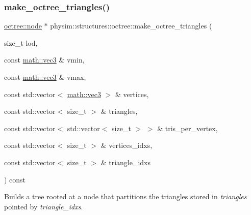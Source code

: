 \subsubsection{\texorpdfstring{make\+\_\+octree\+\_\+triangles()}{make\_octree\_triangles()}}
{\footnotesize\ttfamily \hyperlink{structphysim_1_1structures_1_1octree_1_1node}{octree\+::node} $\ast$ physim\+::structures\+::octree\+::make\+\_\+octree\+\_\+triangles (\begin{DoxyParamCaption}\item[{size\+\_\+t}]{lod,  }\item[{const \hyperlink{structphysim_1_1math_1_1vec3}{math\+::vec3} \&}]{vmin,  }\item[{const \hyperlink{structphysim_1_1math_1_1vec3}{math\+::vec3} \&}]{vmax,  }\item[{const std\+::vector$<$ \hyperlink{structphysim_1_1math_1_1vec3}{math\+::vec3} $>$ \&}]{vertices,  }\item[{const std\+::vector$<$ size\+\_\+t $>$ \&}]{triangles,  }\item[{const std\+::vector$<$ std\+::vector$<$ size\+\_\+t $>$ $>$ \&}]{tris\+\_\+per\+\_\+vertex,  }\item[{const std\+::vector$<$ size\+\_\+t $>$ \&}]{vertices\+\_\+idxs,  }\item[{const std\+::vector$<$ size\+\_\+t $>$ \&}]{triangle\+\_\+idxs }\end{DoxyParamCaption}) const\hspace{0.3cm}{\ttfamily [private]}}



Builds a tree rooted at a node that partitions the triangles stored in {\itshape triangles} pointed by {\itshape triangle\+\_\+idxs}. 



